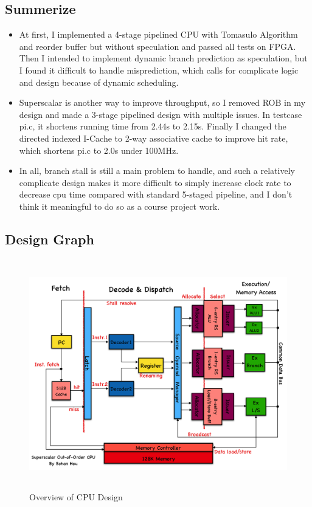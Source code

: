 \documentclass[12pt, a4paper]{article}
\theoremstyle{margin}
\begin{document}
\subsection{Summerize}
\begin{itemize}
  \item At first, I implemented a 4-stage pipelined CPU with Tomasulo Algorithm and reorder buffer but without speculation and passed all tests on FPGA. Then I intended
        to implement dynamic branch prediction as speculation, but I found it difficult to handle misprediction, which calls for complicate logic and design because of dynamic scheduling. 
  \item Superscalar is another way to improve throughput, so I removed ROB in my design and made a 3-stage pipelined design with multiple issues. In testcase pi.c, it shortens
        running time from 2.44s to 2.15s. Finally I changed the directed indexed I-Cache to 2-way associative cache to improve hit rate, which shortens pi.c to 2.0s under 100MHz.
  \item In all, branch stall is still a main problem to handle, and such a relatively complicate design makes it more difficult to simply increase clock rate to decrease cpu time compared
        with standard 5-staged pipeline, and I don't think it meaningful to do so as a course project work.  
\end{itemize}

\subsection{Design Graph}

\begin{figure}[H]
	\begin{center}
	  \includegraphics[height=10cm]{structure.png}
	\end{center}
	\caption{Overview of CPU Design}
\end{figure}
\end{document}
